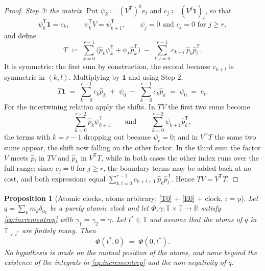 \documentclass[11pt,a4paper]{article}
\theoremstyle{plain}
\newtheorem{proposition}[theorem]{Proposition}
\theoremstyle{definition}
\theoremstyle{remark}
\newcommand{\R}{\mathbb{R}}
\newcommand{\T}{\mathbb{T}}                     %
\newcommand{\one}{\mathbf{1}}
\begin{document}
\begin{proof}
  \emph{Step 3: the matrix.}  Put $\psi_k \coloneqq (V^{\mathsf T})^k e_t$ and
  $c_j \coloneqq (V^j\one)_t$, so that
  \[
    \psi_k^{\mathsf T}\one = c_k ,
    \qquad
    \psi_k^{\mathsf T} V = \psi_{k+1}^{\mathsf T} ,
    \qquad
    \psi_j = 0 \text{ and } c_j = 0 \text{ for } j \geq r ,
  \]
  and define
  \[
    T \;\coloneqq\; \sum_{k=0}^{r-1}
        \bigl( \hat p_k \psi_k^{\mathsf T} + \psi_k \hat p_k^{\mathsf T} \bigr)
      \;-\; \sum_{k,l=0}^{r-1} c_{k+l}\, \hat p_k \hat p_l^{\mathsf T} .
  \]
  It is symmetric: the first sum by construction, the second because $c_{k+l}$
  is symmetric in $(k,l)$.  Multiplying by $\one$ and using Step 2,
  \[
    T\one \;=\; \sum_{k=0}^{r-1} c_k \hat p_k \;+\; \psi_0
      \;-\; \sum_{k=0}^{r-1} c_{k} \hat p_k \;=\; \psi_0 \;=\; e_t .
  \]
  For the intertwining relation apply the shifts.  In $TV$ the first two sums
  become
  \[
    \sum_{k=0}^{r-2} \hat p_k \psi_{k+1}^{\mathsf T}
    \qquad \text{and} \qquad
    \sum_{k=0}^{r-2} \psi_{k+1} \hat p_{k}^{\mathsf T} ,
  \]
  the terms with $k = r-1$ dropping out because $\psi_r = 0$; and in
  $V^{\mathsf T} T$ the same
  two sums appear, the shift now falling on the other factor.  In the third sum
  the factor $V$ meets $\hat p_l$ in $TV$ and $\hat p_k$ in $V^{\mathsf T}T$,
  while in both cases the other index runs over the full range; since $c_j = 0$
  for $j \geq r$, the boundary terms may be added back at no cost, and both
  expressions equal
  $\sum_{k,l=0}^{r-1} c_{k+l+1}\, \hat p_k \hat p_l^{\mathsf T}$.  Hence
  $TV = V^{\mathsf T}T$.
\end{proof}

\begin{proposition}[Atomic clocks, atoms arbitrary; \eqref{T0} + \eqref{E0} + clock, $\iota = \mathrm{p}$]
  \label{prop:atomicposet}
  Let $q = \sum_k m_k \delta_{a_k}$ be a purely atomic clock and let
  $\Phi, \gamma : \T \times \T \to \R$ satisfy \eqref{eq:incrementrep} with
  $\gamma_1 = \gamma_2 = \gamma$.  Let $t^* \in \T$ and assume that the atoms of
  $q$ in $\T_{<t^*}$ are finitely many.  Then
  \[
    \Phi(t^*,0) \;=\; \Phi(0,t^*) .
  \]
  No hypothesis is made on the mutual position of the atoms, and none beyond the
  existence of the integrals in \eqref{eq:incrementrep} and the non-negativity of
  $q$.
\end{proposition}
\end{document}
